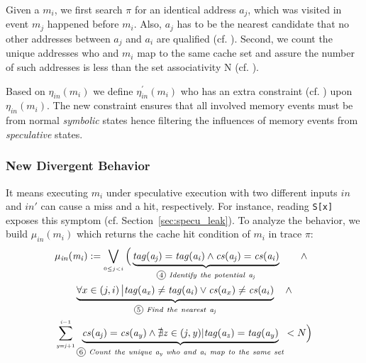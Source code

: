 \documentclass[sigconf,screen]{acmart}
\newcommand*\circled[1]{\tikz[baseline=(char.base)]{
				\node[shape=circle,draw,inner sep=1pt] (char) {\scriptsize{#1}};}}
\begin{document}
Given a $\mathit{m_i}$, we first search $\pi$ for an identical address 
$\mathit{a_j}$, which was visited in event $\mathit{m_j}$ happened before 
$\mathit{m_i}$. Also, $\mathit{a_j}$ has to be the nearest candidate that 
no other addresses between $\mathit{a_j}$ and $\mathit{a_i}$ are qualified
(cf. \circled{1}). Second, we count the unique addresses who and $\mathit{m_i}$
map to the same cache set and assure the number of such addresses is less 
than the set associativity N (cf. \circled{2}).
%

Based on $\mathit{\eta_{in}(m_i)}$ we define $\mathit{\eta^\prime_{in}(m_i)}$
who has an extra constraint (cf. \circled{3}) upon $\mathit{\eta_{in}(m_i)}$. 
The new constraint ensures that all involved memory events must be from 
normal \textit{symbolic} states hence filtering the influences of memory 
events from \textit{speculative} states.

\subsubsection{New Divergent Behavior}
\label{sec:new_div}
It means executing $\mathit{m_i}$ under speculative execution with two different
inputs $\mathit{in}$ and $\mathit{in'}$ can cause a miss and a hit, respectively. 
For instance, reading \texttt{S[x]} exposes this symptom (cf. Section~\ref{sec:specu_leak}). 
To analyze the behavior, we build $\mathit{\mu_{in}(m_i)}$ which returns the cache
hit condition of $\mathit{m_i}$ in trace $\pi$:
%
%
\begin{multline}
  \label{eqn:hc}
    \mathit{\mu_{in}(m_i)}:=
    \bigvee_{{\scriptscriptstyle 0{\leq}j<i}}
    \Big(
    \underbrace{
      \mathit{tag(a_j)}=\mathit{tag(a_i)} 
			\wedge 
      \mathit{cs(a_j)}=\mathit{cs(a_i)} 
    }_{{\circled{4}}\mathit{~Identify~the~potential~a_j}}
    ~~~~~~\wedge 
		~~\\
    \underbrace{
      {\forall}x\in\left(j,i\right)\big |\mathit{tag(a_x)}\ne\mathit{tag(a_i)}
      \vee 
      \mathit{cs}(a_x)\ne\mathit{cs}(a_i)
    }_{{\circled{5}}\mathit{~Find~the~nearest~a_j}}
		~~~\wedge 
		\\
    \sum_{{\scriptscriptstyle \mathit{y=j}+1}}^{{\scriptscriptstyle \mathit{i-}1}} 
    \underbrace{
      \mathit{cs(a_j)}=\mathit{cs(a_y)} 
      \wedge
      \nexists\mathit{z}\in(\mathit{j,y})|\mathit{tag(a_z)}=\mathit{tag(a_y)}
    }_{{\circled{6}}\mathit{~Count~the~unique~a_y~who~and~a_i~map~to~the~same~set}}
    <N 
    \Big)
\end{multline}
\vspace{.8ex}
%
%
\end{document}

